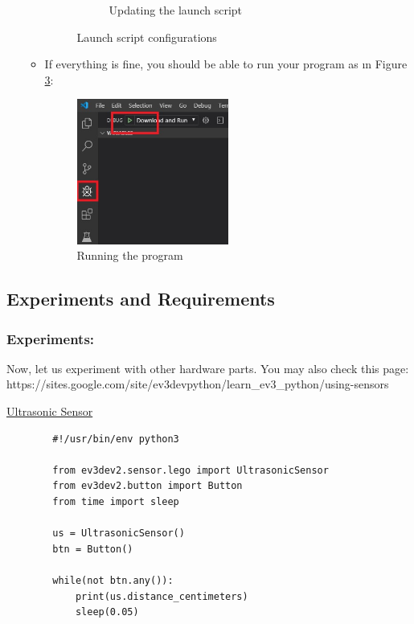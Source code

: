 \documentclass{scrartcl}
\begin{document}
\begin{enumerate}
\begin{itemize}
\begin{figure}
\begin{subfigure}{.5\textwidth}
                  \caption{Updating the launch script}
                  \label{fig:unp}
                \end{subfigure}
                \caption{Launch script configurations}
            \end{figure}
    
        \item If everything is fine, you should be able to run your program as ın Figure \ref{fig:run}:
        \begin{figure}[h!]
            \begin{center}
              \includegraphics[width=0.5\textwidth]{run.jpg}
              \caption{Running the program}
              \label{fig:run}
            \end{center}
        \end{figure}
    \end{itemize}

\end{enumerate}

\subsection{Experiments and Requirements}
\subsubsection{Experiments:}
Now, let us experiment with other hardware parts. You may also check this page: \\https://sites.google.com/site/ev3devpython/learn\_ev3\_python/using-sensors

\underline{Ultrasonic Sensor}
    \begin{lstlisting}
        #!/usr/bin/env python3
        
        from ev3dev2.sensor.lego import UltrasonicSensor
        from ev3dev2.button import Button
        from time import sleep
        
        us = UltrasonicSensor()
        btn = Button()
        
        while(not btn.any()):
            print(us.distance_centimeters)
            sleep(0.05)
    \end{lstlisting}
\end{document}
